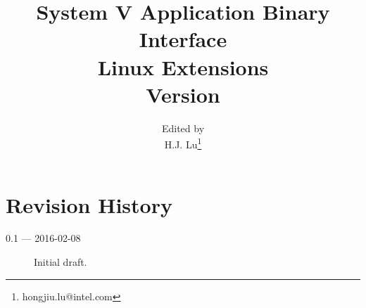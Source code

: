 \documentclass[12pt]{report}
\begin{document}
\author{Edited by\\
  H.J. Lu\thanks{hongjiu.lu@intel.com}}

\title{System V Application Binary Interface\\
{\Large Linux Extensions\\
Version \version}}
\maketitle
\tableofcontents
\listoftables
\listoffigures

\section*{Revision History}

\begin{description}

\item[0.1 --- 2016-02-08] Initial draft.
\end{description}





\appendix

\end{document}
